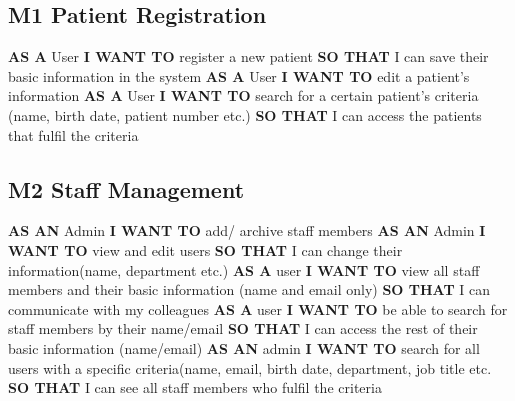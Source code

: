 \noindent
\subsection*{M1 Patient Registration}
\textbf{AS A} User\newline
\textbf{I WANT TO} register a new patient\newline
\textbf{SO THAT} I can save their basic information in the system\newline
\medbreak
\noindent
\textbf{AS A} User\newline
\textbf{I WANT TO} edit a patient's information\newline
\medbreak
\noindent
\textbf{AS A} User\newline
\textbf{I WANT TO} search for a certain patient's criteria (name, birth date, patient number etc.)\newline
\textbf{SO THAT} I can access the patients that fulfil the criteria\newline
\medbreak
\noindent
\subsection*{M2 Staff Management}
\textbf{AS AN} Admin\newline
\textbf{I WANT TO} add/ archive staff members\newline
\medbreak
\noindent
\textbf{AS AN} Admin\newline
\textbf{I WANT TO} view and edit users\newline
\textbf{SO THAT} I can change their information(name, department etc.)\newline
\medbreak
\noindent
\textbf{AS A} user\newline
\textbf{I WANT TO} view all staff members and their basic information (name and email only)\newline
\textbf{SO THAT} I can communicate with my colleagues\newline
\medbreak
\noindent
\textbf{AS A} user\newline
\textbf{I WANT TO} be able to search for staff members by their name/email\newline
\textbf{SO THAT} I can access the rest of their basic information (name/email)\newline
\medbreak
\noindent
\textbf{AS AN} admin\newline
\textbf{I WANT TO} search for all users with a specific criteria(name, email, birth date, department, job title etc.\newline
\textbf{SO THAT} I can see all staff members who fulfil the criteria\newline
\medbreak
\noindent
